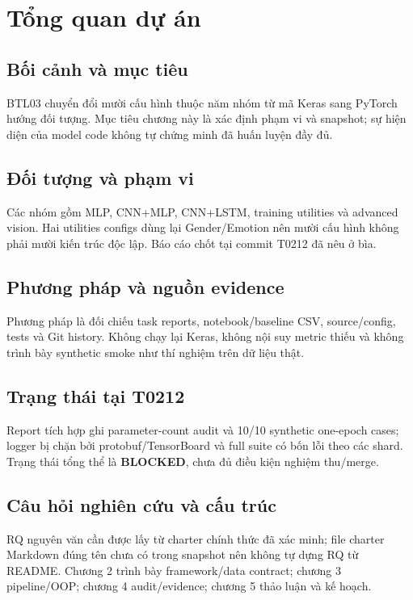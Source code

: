 \chapter{Tổng quan dự án}

\section{Bối cảnh và mục tiêu}
BTL03 chuyển đổi mười cấu hình thuộc năm nhóm từ mã Keras sang PyTorch hướng đối tượng. Mục tiêu chương này là xác định phạm vi và snapshot; sự hiện diện của model code không tự chứng minh đã huấn luyện đầy đủ.

\section{Đối tượng và phạm vi}
Các nhóm gồm MLP, CNN+MLP, CNN+LSTM, training utilities và advanced vision. Hai utilities configs dùng lại Gender/Emotion nên mười cấu hình không phải mười kiến trúc độc lập. Báo cáo chốt tại commit T0212 đã nêu ở bìa.

\section{Phương pháp và nguồn evidence}
Phương pháp là đối chiếu task reports, notebook/baseline CSV, source/config, tests và Git history. Không chạy lại Keras, không nội suy metric thiếu và không trình bày synthetic smoke như thí nghiệm trên dữ liệu thật.

\section{Trạng thái tại T0212}
Report tích hợp ghi parameter-count audit và 10/10 synthetic one-epoch cases; logger bị chặn bởi protobuf/TensorBoard và full suite có bốn lỗi theo các shard. Trạng thái tổng thể là \textbf{BLOCKED}, chưa đủ điều kiện nghiệm thu/merge.

\section{Câu hỏi nghiên cứu và cấu trúc}
RQ nguyên văn cần được lấy từ charter chính thức đã xác minh; file charter Markdown đúng tên chưa có trong snapshot nên không tự dựng RQ từ README. Chương 2 trình bày framework/data contract; chương 3 pipeline/OOP; chương 4 audit/evidence; chương 5 thảo luận và kế hoạch.